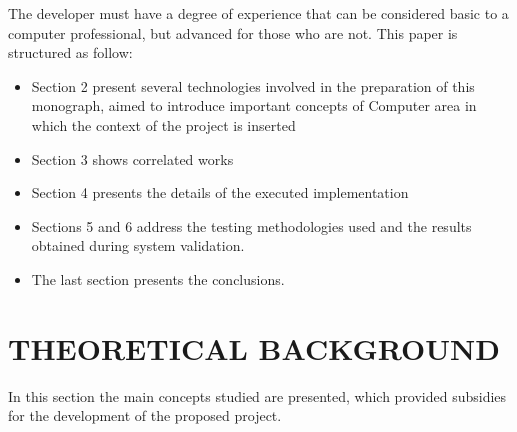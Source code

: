\documentclass{acm_proc_article-sp}
\begin{document}
\newline
\newline
The developer must have a degree of experience that can be considered basic to a computer professional, but advanced for those who are not.
\newline This paper is structured as follow:
\begin{itemize}
\item Section 2 present several technologies involved in the preparation of this monograph, aimed to introduce important concepts of Computer area in which the context of the project is inserted
\item Section 3 shows correlated works
\item Section 4 presents the details of the executed implementation
\item Sections 5 and 6 address the testing methodologies used and the results obtained during system validation. 
\item The last section presents the conclusions.
\end{itemize}

\section{THEORETICAL BACKGROUND}
In this section the main concepts studied are presented, which provided subsidies for the development of the proposed project.
\end{document}
